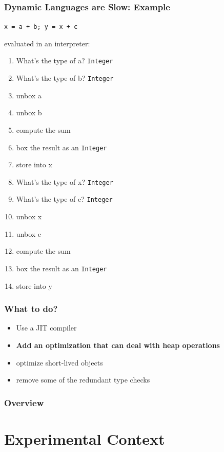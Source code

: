 \documentclass[utf8x]{beamer}
\begin{document}
\begin{frame}
  \frametitle{Dynamic Languages are Slow: Example}
  \texttt{x = a + b; y = x + c}

  evaluated in an interpreter:
  \pause
  \begin{enumerate}
      \item What's the type of a? \texttt{Integer}
      \item What's the type of b? \texttt{Integer}
  \pause
      \item unbox a
      \item unbox b
      \item compute the sum
  \pause
      \item box the result as an \texttt{Integer}
      \item store into x
  \pause
      \item What's the type of x? \texttt{Integer}
      \item What's the type of c? \texttt{Integer}
  \pause
      \item unbox x
      \item unbox c
      \item compute the sum
  \pause
      \item box the result as an \texttt{Integer}
      \item store into y
  \end{enumerate}
\end{frame}

\begin{frame}
  \frametitle{What to do?}
  \begin{itemize}
      \item Use a JIT compiler
      \item \textbf{Add an optimization that can deal with heap operations}
      \pause
      \item optimize short-lived objects
      \item remove some of the redundant type checks
  \end{itemize}
\end{frame}

\begin{frame}
  \frametitle{Overview}
  \tableofcontents
\end{frame}

\section{Experimental Context}
\end{document}

